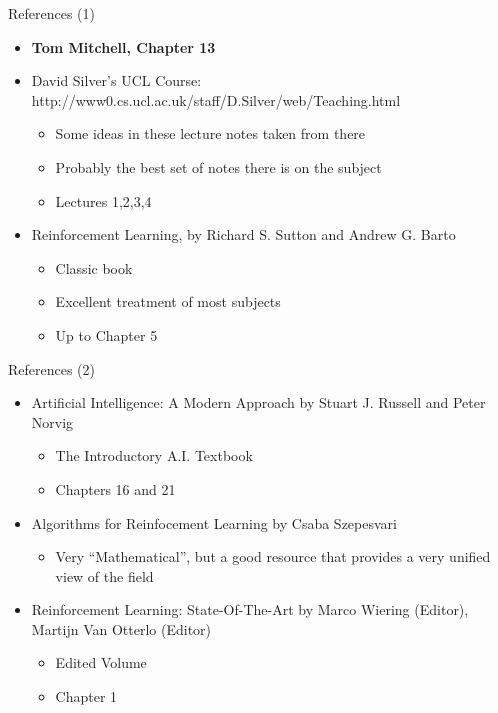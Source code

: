 \documentclass[]{beamer}
\providecommand{\tightlist}{%
  \setlength{\itemsep}{0pt}\setlength{\parskip}{0pt}}
\begin{document}
\begin{frame}{References (1)}

\begin{itemize}
\tightlist
\item
  \textbf{Tom Mitchell, Chapter 13}
\item
  David Silver's UCL Course:
  http://www0.cs.ucl.ac.uk/staff/D.Silver/web/Teaching.html

  \begin{itemize}
  \tightlist
  \item
    Some ideas in these lecture notes taken from there
  \item
    Probably the best set of notes there is on the subject
  \item
    Lectures 1,2,3,4
  \end{itemize}
\item
  Reinforcement Learning, by Richard S. Sutton and Andrew G. Barto

  \begin{itemize}
  \tightlist
  \item
    Classic book
  \item
    Excellent treatment of most subjects
  \item
    Up to Chapter 5
  \end{itemize}
\end{itemize}

\end{frame}

\begin{frame}{References (2)}

\begin{itemize}
\tightlist
\item
  Artificial Intelligence: A Modern Approach by Stuart J. Russell and
  Peter Norvig

  \begin{itemize}
  \tightlist
  \item
    The Introductory A.I. Textbook
  \item
    Chapters 16 and 21
  \end{itemize}
\item
  Algorithms for Reinfocement Learning by Csaba Szepesvari

  \begin{itemize}
  \tightlist
  \item
    Very ``Mathematical'', but a good resource that provides a very
    unified view of the field
  \end{itemize}
\item
  Reinforcement Learning: State-Of-The-Art by Marco Wiering (Editor),
  Martijn Van Otterlo (Editor)

  \begin{itemize}
  \tightlist
  \item
    Edited Volume
  \item
    Chapter 1
  \end{itemize}
\end{itemize}

\end{frame}
\end{document}

